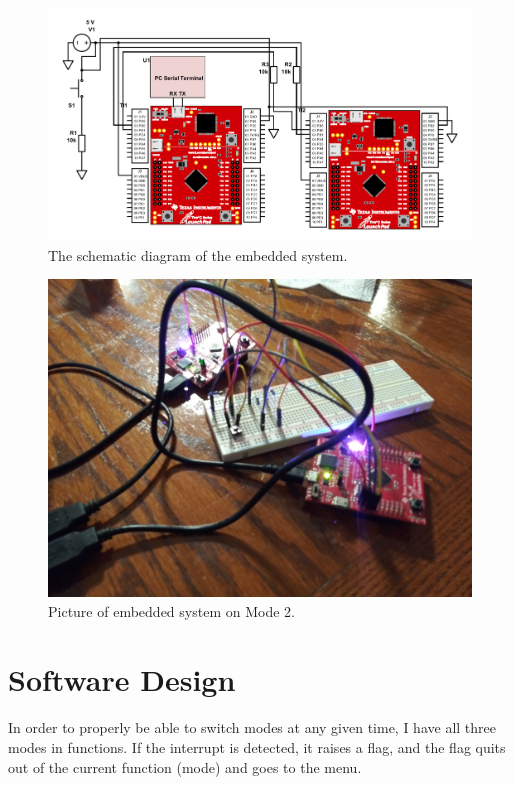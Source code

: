 \documentclass{article}
\begin{document}
\begin{figure}[H]
	\centering
	\includegraphics[width=\textwidth]{Images/schematic-diagram}
	\caption{The schematic diagram of the embedded system.}
	\label{diagram}
\end{figure}

\begin{figure}[H]
	\centering
	\includegraphics[width=\textwidth]{Images/20211013_213328}
	\caption{Picture of embedded system on Mode 2.}
	\label{picture}
\end{figure}

\section{Software Design}
In order to properly be able to switch modes at any given time,
I have all three modes in functions. If the interrupt is
detected, it raises a flag, and the flag quits out of the
current function (mode) and goes to the menu.
\end{document}

